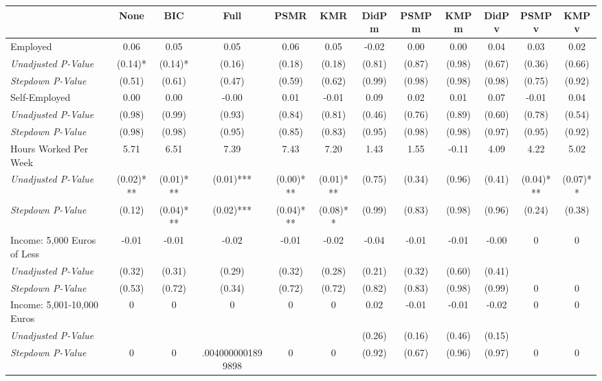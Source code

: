 \begin{tabular}{l c c c c c c c c c c c}
\toprule
 & None & BIC & Full & PSMR & KMR & DidPm & PSMPm & KMPm & DidPv & PSMPv & KMPv \\
\midrule
Employed & 0.06 & 0.05 & 0.05 & 0.06 & 0.05 & -0.02 & 0.00 & 0.00 & 0.04 & 0.03 & 0.02 \\
\quad \textit{Unadjusted P-Value} & (0.14)* & (0.14)* & (0.16) & (0.18) & (0.18) & (0.81) & (0.87) & (0.98) & (0.67) & (0.36) & (0.66) \\
\quad \textit{Stepdown P-Value} & (0.51) & (0.61) & (0.47) & (0.59) & (0.62) & (0.99) & (0.98) & (0.98) & (0.98) & (0.75) & (0.92) \\
Self-Employed & 0.00 & 0.00 & -0.00 & 0.01 & -0.01 & 0.09 & 0.02 & 0.01 & 0.07 & -0.01 & 0.04 \\
\quad \textit{Unadjusted P-Value} & (0.98) & (0.99) & (0.93) & (0.84) & (0.81) & (0.46) & (0.76) & (0.89) & (0.60) & (0.78) & (0.54) \\
\quad \textit{Stepdown P-Value} & (0.98) & (0.98) & (0.95) & (0.85) & (0.83) & (0.95) & (0.98) & (0.98) & (0.97) & (0.95) & (0.92) \\
Hours Worked Per Week & 5.71 & 6.51 & 7.39 & 7.43 & 7.20 & 1.43 & 1.55 & -0.11 & 4.09 & 4.22 & 5.02 \\
\quad \textit{Unadjusted P-Value} & (0.02)*** & (0.01)*** & (0.01)*** & (0.00)*** & (0.01)*** & (0.75) & (0.34) & (0.96) & (0.41) & (0.04)*** & (0.07)** \\
\quad \textit{Stepdown P-Value} & (0.12) & (0.04)*** & (0.02)*** & (0.04)*** & (0.08)** & (0.99) & (0.83) & (0.98) & (0.96) & (0.24) & (0.38) \\
Income: 5,000 Euros of Less & -0.01 & -0.01 & -0.02 & -0.01 & -0.02 & -0.04 & -0.01 & -0.01 & -0.00 & 0 & 0 \\
\quad \textit{Unadjusted P-Value} & (0.32) & (0.31) & (0.29) & (0.32) & (0.28) & (0.21) & (0.32) & (0.60) & (0.41) & & \\
\quad \textit{Stepdown P-Value} & (0.53) & (0.72) & (0.34) & (0.72) & (0.72) & (0.82) & (0.83) & (0.98) & (0.99) & 0 & 0 \\
Income: 5,001-10,000 Euros & 0 & 0 & 0 & 0 & 0 & 0.02 & -0.01 & -0.01 & -0.02 & 0 & 0 \\
\quad \textit{Unadjusted P-Value} & & & & & & (0.26) & (0.16) & (0.46) & (0.15) & & \\
\quad \textit{Stepdown P-Value} & 0 & 0 & .0040000001899898 & 0 & 0 & (0.92) & (0.67) & (0.96) & (0.97) & 0 & 0 \\

\end{tabular}
